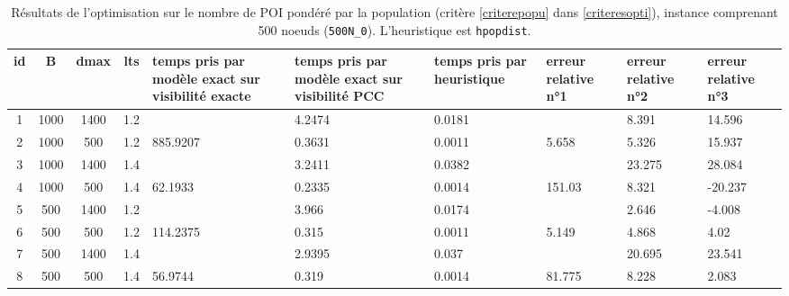 \begin{sidewaystable}
    \centering
    \caption{Résultats de l'optimisation sur le nombre de POI pondéré par la population (critère \ref{criterepopu} dans \ref{criteresopti}), instance comprenant 500 noeuds (\texttt{500N\_0}). L'heuristique est \texttt{hpopdist}.}
    \label{tab:500popdist}
    \begin{tabular}{|c|c|c|c|p{3cm}|p{3cm}|p{3cm}|p{2cm}|p{2cm}|p{2cm}|}
    \hline
    id & B & dmax & lts & temps pris par
    modèle exact sur visibilité exacte & temps pris par
    modèle exact sur visibilité PCC & temps pris par
    heuristique & erreur relative n°1 & erreur relative n°2 & erreur relative n°3 \\
    \hline
    1 & 1000 & 1400 & 1.2 &  & 4.2474 & 0.0181 &  & 8.391 & 14.596 \\
    2 & 1000 & 500 & 1.2 & 885.9207 & 0.3631 & 0.0011 & 5.658 & 5.326 & 15.937 \\
    3 & 1000 & 1400 & 1.4 &  & 3.2411 & 0.0382 &  & 23.275 & 28.084 \\
    4 & 1000 & 500 & 1.4 & 62.1933 & 0.2335 & 0.0014 & 151.03 & 8.321 & -20.237 \\
    5 & 500 & 1400 & 1.2 &  & 3.966 & 0.0174 &  & 2.646 & -4.008 \\
    6 & 500 & 500 & 1.2 & 114.2375 & 0.315 & 0.0011 & 5.149 & 4.868 & 4.02 \\
    7 & 500 & 1400 & 1.4 &  & 2.9395 & 0.037 &  & 20.695 & 23.541 \\
    8 & 500 & 500 & 1.4 & 56.9744 & 0.319 & 0.0014 & 81.775 & 8.228 & 2.083 \\
    \hline
    \end{tabular}


\end{sidewaystable}

